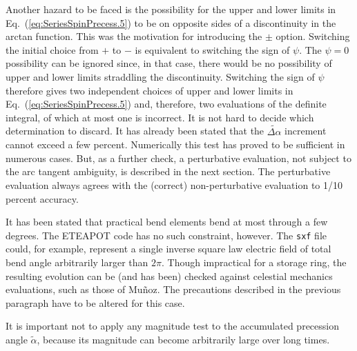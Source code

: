 \documentclass[]{article}
\begin{document}
Another hazard to be faced is the possibility for the upper and
lower limits in Eq.~(\ref{eq:SeriesSpinPrecess.5}) to be
on opposite sides of a discontinuity in the arctan function.
This was the motivation for introducing the $\pm$ option.
Switching the initial choice from $+$ to $-$ is equivalent to switching
the sign of $\psi$. The $\psi=0$ possibility can be ignored since,
in that case, there would be no possibility of upper and lower limits 
straddling the discontinuity. Switching the sign of $\psi$ therefore
gives two independent choices of upper and lower limits in 
Eq.~(\ref{eq:SeriesSpinPrecess.5}) and, therefore, two evaluations
of the definite integral, of which at most one is incorrect. It
is not hard to decide which determination to discard. It has already
been stated that the $\widetilde{\Delta\alpha}$ increment cannot exceed a
few percent. Numerically this test has proved to be sufficient in
numerous cases. But, as a further check, a perturbative evaluation,
not subject to the arc tangent ambiguity, is described in the next
section. The perturbative evaluation always agrees with the (correct)
non-perturbative evaluation to 1/10 percent accuracy.

It has been stated that practical bend elements bend at most through
a few degrees. The ETEAPOT code has no such constraint, however. The
{\tt sxf} file could, for example, represent a single inverse square
law electric field of total bend angle arbitrarily larger than $2\pi$.
Though impractical for a storage ring, the resulting evolution can
be (and has been) checked against celestial mechanics evaluations, 
such as those of Mu\~noz. The precautions described in the previous
paragraph have to be altered for this case.

It is important not to apply any magnitude test to 
the accumulated precession angle $\tilde\alpha$, because its
magnitude can become arbitrarily large over long times.
\end{document}
